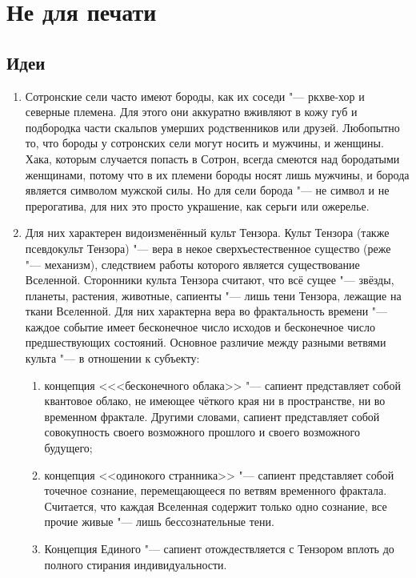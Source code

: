 \chapter{Не для печати}

\section{Идеи}

\begin{enumerate}

\item Сотронские сели часто имеют бороды, как их соседи "--- ркхве-хор и северные племена.
Для этого они аккуратно вживляют в кожу губ и подбородка части скальпов умерших родственников или друзей.
Любопытно то, что бороды у сотронских сели могут носить и мужчины, и женщины.
Хака, которым случается попасть в Сотрон, всегда смеются над бородатыми женщинами, потому что в их племени бороды носят лишь мужчины, и борода является символом мужской силы.
Но для сели борода "--- не символ и не прерогатива, для них это просто украшение, как серьги или ожерелье.

\item Для них характерен видоизменённый культ Тензора.
Культ Тензора (также псевдокульт Тензора) "--- вера в некое сверхъестественное существо (реже "--- механизм), следствием работы которого является существование Вселенной.
Сторонники культа Тензора считают, что всё сущее "--- звёзды, планеты, растения, животные, сапиенты "--- лишь тени Тензора, лежащие на ткани Вселенной.
Для них характерна вера во фрактальность времени "--- каждое событие имеет бесконечное число исходов и бесконечное число предшествующих состояний.
Основное различие между разными ветвями культа "--- в отношении к субъекту:

\begin{enumerate}
\item концепция <<<бесконечного облака>> "--- сапиент представляет собой квантовое облако, не имеющее чёткого края ни в пространстве, ни во временном фрактале.
Другими словами, сапиент представляет собой совокупность своего возможного прошлого и своего возможного будущего;
\item концепция <<одинокого странника>> "--- сапиент представляет собой точечное сознание, перемещающееся по ветвям временного фрактала.
Считается, что каждая Вселенная содержит только одно сознание, все прочие живые "--- лишь бессознательные тени.
\item Концепция Единого "--- сапиент отождествляется с Тензором вплоть до полного стирания индивидуальности.                                                                                                            \end{enumerate}


\end{enumerate}

